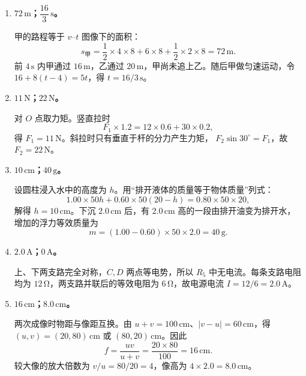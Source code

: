\documentclass[11pt,a4paper]{ctexart}
\newcommand{\unit}[1]{\,\mathrm{#1}}
\begin{document}
\begin{enumerate}[label=\textbf{\arabic*.},leftmargin=2.2em,itemsep=1.1em]
  \item \textbf{$72\unit{m}$；$\dfrac{16}{3}\unit{s}$。}

  甲的路程等于 $v$--$t$ 图像下的面积：
  \[
    s_\text{甲}=\frac12\times4\times8+6\times8+\frac12\times2\times8=72\unit{m}.
  \]
  前 $4\unit{s}$ 内甲通过 $16\unit{m}$，乙通过 $20\unit{m}$，甲尚未追上乙。随后甲做匀速运动，令
  $16+8(t-4)=5t$，得 $t=16/3\unit{s}$。

  \item \textbf{$11\unit{N}$；$22\unit{N}$。}

  对 $O$ 点取力矩。竖直拉时
  \[
    F_1\times1.2=12\times0.6+30\times0.2,
  \]
  得 $F_1=11\unit{N}$。斜拉时只有垂直于杆的分力产生力矩，
  $F_2\sin30^\circ=F_1$，故 $F_2=22\unit{N}$。

  \item \textbf{$10\unit{cm}$；$40\unit{g}$。}

  设圆柱浸入水中的高度为 $h$。用“排开液体的质量等于物体质量”列式：
  \[
    1.00\times50h+0.60\times50(20-h)=0.80\times50\times20,
  \]
  解得 $h=10\unit{cm}$。下沉 $2.0\unit{cm}$ 后，有 $2.0\unit{cm}$ 高的一段由排开油变为排开水，增加的浮力等效质量为
  \[
    m=(1.00-0.60)\times50\times2.0=40\unit{g}.
  \]

  \item \textbf{$2.0\unit{A}$；$0\unit{A}$。}

  上、下两支路完全对称，$C,D$ 两点等电势，所以 $R_5$ 中无电流。每条支路电阻均为
  $12\unit{\Omega}$，两支路并联后的等效电阻为 $6\unit{\Omega}$，故电源电流
  $I=12/6=2.0\unit{A}$。

  \item \textbf{$16\unit{cm}$；$8.0\unit{cm}$。}

  两次成像时物距与像距互换。由 $u+v=100\unit{cm}$、$|v-u|=60\unit{cm}$，得
  $(u,v)=(20,80)\unit{cm}$ 或 $(80,20)\unit{cm}$。因此
  \[
    f=\frac{uv}{u+v}=\frac{20\times80}{100}=16\unit{cm}.
  \]
  较大像的放大倍数为 $v/u=80/20=4$，像高为 $4\times2.0=8.0\unit{cm}$。
\end{enumerate}
\fi
\end{document}

